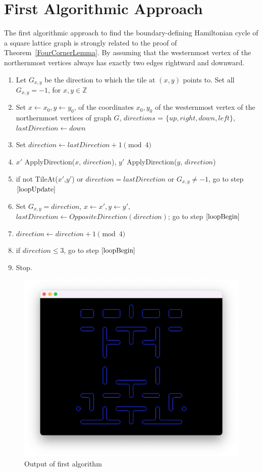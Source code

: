 \section{First Algorithmic Approach}
The first algorithmic approach to find the boundary-defining Hamiltonian cycle of a square lattice graph is strongly related to the proof of Theorem~\ref{FourCornerLemma}. By assuming that the westernmost vertex of the northernmost vertices always has exactly two edges rightward and downward. 
\begin{enumerate}[1.]
\item Let $G_{x,y}$ be the direction to which the tile at $(x,y)$ points to. Set all $G_{x,y}=-1$, for $x,y \in \mathbb{Z}$
\item Set $x\gets x_0, y\gets y_0$, of the coordinates $x_0,y_0$ of the westernmost vertex of the northernmost vertices of graph $G$, $directions$ = $\{up,right,down,left\}$, $lastDirection\gets down$
\item \label{loopBegin} Set $direction \gets lastDirection+1 \pmod{4}$
\item $x'$ \gets ApplyDirection($x$, $direction$), $y'$ \gets ApplyDirection($y$, $direction$)
\item if not TileAt($x'$,$y'$) or $direction = lastDirection$ or $G_{x,y}\ne -1$, go to step $\ref{loopUpdate}$
\item Set $G_{x,y} = direction$, $x \gets x', y \gets y'$, $lastDirection \gets OppositeDirection(direction)$; go to step $\ref{loopBegin}$
\item \label{loopUpdate} $direction \gets direction+1 \pmod{4}$
\item if $direction\leq 3$, go to step $\ref{loopBegin}$
\item Stop.
\end{enumerate}
\begin{figure}[H]
\centering
\includegraphics[width=0.8\linewidth]{Image-8.png}
\caption {Output of first algorithm\autocite{myself}}\label{FirstOutput}
\end{figure}